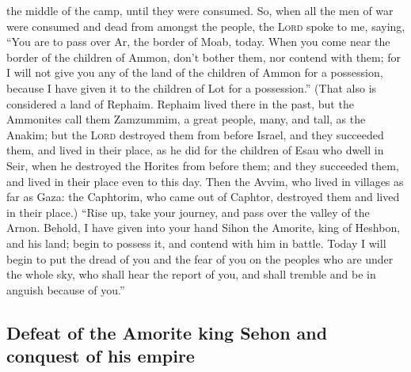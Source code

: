 the middle of the camp, until they were consumed.  So,
when all the men of war were consumed and dead from amongst the people,
 the \textsc{Lord} spoke to me, saying, 
``You are to pass over Ar, the border of Moab, today. 
When you come near the border of the children of Ammon, don't bother
them, nor contend with them; for I will not give you any of the land of
the children of Ammon for a possession, because I have given it to the
children of Lot for a possession.''  (That also is
considered a land of Rephaim. Rephaim lived there in the past, but the
Ammonites call them Zamzummim,  a great people, many, and
tall, as the Anakim; but the \textsc{Lord} destroyed them from before
Israel, and they succeeded them, and lived in their place,
 as he did for the children of Esau who dwell in Seir,
when he destroyed the Horites from before them; and they succeeded them,
and lived in their place even to this day.  Then the
Avvim, who lived in villages as far as Gaza: the Caphtorim, who came out
of Caphtor, destroyed them and lived in their place.) 
``Rise up, take your journey, and pass over the valley of the Arnon.
Behold, I have given into your hand Sihon the Amorite, king of Heshbon,
and his land; begin to possess it, and contend with him in battle.
 Today I will begin to put the dread of you and the fear
of you on the peoples who are under the whole sky, who shall hear the
report of you, and shall tremble and be in anguish because of you.''

\hypertarget{defeat-of-the-amorite-king-sehon-and-conquest-of-his-empire}{%
\subsection{Defeat of the Amorite king Sehon and conquest of his
empire}\label{defeat-of-the-amorite-king-sehon-and-conquest-of-his-empire}}

